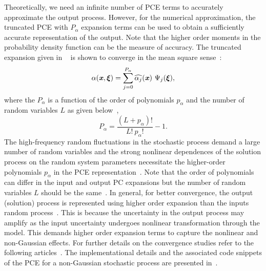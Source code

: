 \documentclass[letter,1p,11pt,oneside,onecolumn,sort&compress]{elsarticle}
\begin{document}
Theoretically, we need an infinite number of PCE terms to accurately approximate the output process.
However, for the numerical approximation, the truncated PCE with $P_{\alpha}$ expansion terms can be used to obtain a sufficiently accurate representation of the output. Note that the higher order moments in the probability density function can be the measure of accuracy.
The truncated expansion given in ~ is shown to converge in the mean square sense~\cite{ghanemSFEM1991}:
\begin{equation}
\alpha(\textbf{\textit{x}}, \bxi) = \sum^{P_{\alpha} }_{j=0}{{ \widehat{\alpha_j}}(\textbf{\textit{x}}) \ {\Psi }_{
j}{\rm (}{\bxi} {\rm )}},
\label{eq:truncatedpce}
\end{equation}
where the $P_{\alpha}$ is a function of the order of polynomials $p_{\alpha}$ and the number of random variables $L$ as given below~\cite{ghanemSFEM1991},
\begin{equation} \label{eq:np}
P_{\alpha} = \frac{(L+p_{\alpha})!}{L! \ p_{\alpha}!} - 1.
\end{equation}
The high-frequency random fluctuations in the stochastic process demand a large number of random variables and the strong nonlinear dependences of the solution process on the random system parameters necessitate the higher-order polynomials $p_{\alpha}$ in the PCE representation~\cite{ghanem1999ingredients,ghanem1999stochastic,huang2001convergence}.
Note that the order of polynomials can differ in the input and output PC expansions but the number of random variables $L$ should be the same~\cite{ghanemSFEM1991,le2010spectral,ghanem1999ingredients}.
In general, for better convergence, the output (solution) process is represented using higher order expansion than the inputs random process~\cite{ghanem1999ingredients,le2010spectral}. This is because the uncertainty in the output process may amplify as the input uncertainty undergoes nonlinear transformation through the model. This demands higher order expansion terms to capture the nonlinear and non-Gaussian effects. For further details on the convergence studies refer to the following articles~\cite{ghanem1999ingredients,ghanem1999stochastic,huang2001convergence}.
The implementational details and the associated code snippets of the PCE for a non-Gaussian stochastic process are presented in~\cite{desai2019scalable}.
\end{document}
